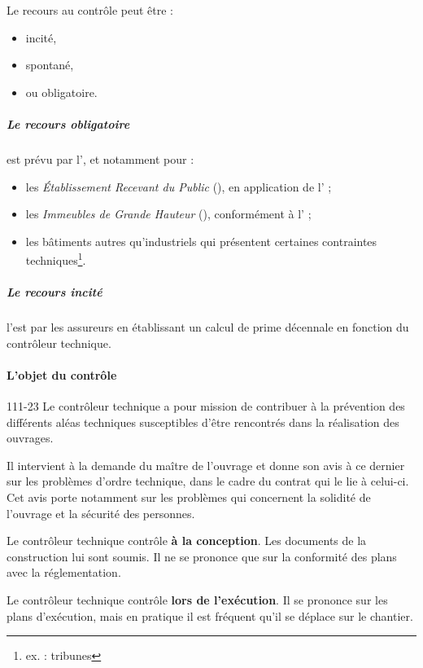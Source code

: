 					Le recours au contrôle peut être :
					\begin{itemize}
						\item incité,
						\item spontané,
						\item ou obligatoire.
					\end{itemize}

					\subparagraph{Le recours obligatoire} est prévu par l', et notamment pour :
					\begin{itemize}
						\item les \emph{Établissement Recevant du Public} (\ERP), en application de l' ;
						\item les \emph{Immeubles de Grande Hauteur} (\IGH), conformément à l' ;
						\item les bâtiments autres qu'industriels qui présentent certaines contraintes techniques\footnote{ex. : tribunes}.
					\end{itemize}

					\subparagraph{Le recours incité} l'est par les assureurs en établissant un calcul de prime décennale en fonction du contrôleur technique.

				\paragraph{L'objet du contrôle}

					\begin{citationArticle}[L]{111-23}{\cch}
						Le contrôleur technique a pour mission de contribuer à la prévention des différents aléas techniques susceptibles d'être rencontrés dans la réalisation des ouvrages.

						Il intervient à la demande du maître de l'ouvrage et donne son avis à ce dernier sur les problèmes d'ordre technique, dans le cadre du contrat qui le lie à celui-ci. Cet avis porte notamment sur les problèmes qui concernent la solidité de l'ouvrage et la sécurité des personnes.
					\end{citationArticle}

					Le contrôleur technique contrôle \textbf{à la conception}. Les documents de la construction lui sont soumis. Il ne se prononce que sur la conformité des plans avec la réglementation.

					Le contrôleur technique contrôle \textbf{lors de l'exécution}. Il se prononce sur les plans d'exécution, mais en pratique il est fréquent qu'il se déplace sur le chantier.

